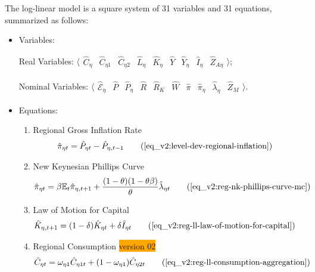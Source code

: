 \documentclass[../thesis.tex]{subfiles}
\begin{document}
The log-linear model is a square system of 31 variables and 31 equations, summarized as follows:

{\singlespacing

\begin{itemize}
	
	\item Variables:
	
	Real Variables: $\langle \begin{smallmatrix} \hat{C}_{\eta} & \hat{C}_{\eta 1} & \hat{C}_{\eta 2} & \hat{L}_{\eta} & \hat{K}_{\eta} & \hat{Y} & \hat{Y}_{\eta} & \hat{I}_{\eta} & \hat{Z}_{A\eta} \end{smallmatrix} \rangle$;
	
	Nominal Variables: $\langle \begin{smallmatrix} \hat{\mathscr{E}}_{\eta} & \hat{P} & \hat{P}_{\eta} & \hat{R} & \hat{R}_{K} & \hat{W} & \hat{\pi} & \hat{\pi}_{\eta} & \hat{\lambda}_{\eta} & \hat{Z}_M \end{smallmatrix} \rangle$.
	
	\item Equations:
	
	\begin{enumerate}
		
		\item Regional Gross Inflation Rate
		\begin{align}
			\hat{\pi}_{\eta t} &= \hat{P}_{\eta t} - \hat{P}_{\eta, t-1} \tag{\ref{eq_v2:level-dev-regional-inflation}}
		\end{align}
		
		\item New Keynesian Phillips Curve
		\begin{align}
			\hat{\pi}_{\eta t} &= \beta \E \hat{\pi}_{\eta, t+1} + \frac{(1-\theta) (1- \theta \beta)}{\theta} \hat{\lambda}_{\eta t} \tag{\ref{eq_v2:reg-nk-phillips-curve-mc}}
		\end{align}
		
		\item Law of Motion for Capital
		\begin{alignat}{2}
			\hat{K}_{\eta, t+1} &= (1-\delta) \hat{K}_{\eta t} + \delta \hat{I}_{\eta t} \tag{\ref{eq_v2:reg-ll-law-of-motion-for-capital}}
		\end{alignat}
		

\item Regional Consumption \colorbox{orange}{version 02}
\begin{align}
	\hat{C}_{\eta t} &= \omega_{\eta 1} \hat{C}_{\eta 1 t} + (1-\omega_{\eta 1}) \hat{C}_{\eta 2 t} \tag{\ref{eq_v2:reg-ll-consumption-aggregation}}
\end{align}


\end{enumerate}
\end{itemize}}
\end{document}
